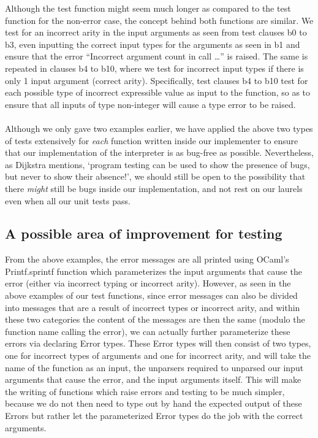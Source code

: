 Although the test function might seem much longer as compared to the test function for the non-error case, the concept behind both functions are similar. We test for an incorrect arity in the input arguments as seen from test 
clauses b0 to b3, even inputting the correct input types for the arguments as seen in b1 and ensure that the error “Incorrect argument count in call …” is raised. The same is repeated in clauses b4 to b10, where we test for 
incorrect input types if there is only 1 input argument (correct arity). Specifically, test clauses b4 to b10 test for each possible type of incorrect expressible value as input to the function, so as to ensure that all inputs 
of type non-integer will cause a type error to be raised.
\\
\\
Although we only gave two examples earlier, we have applied the above two types of tests extensively for \textit{each} function written inside our implementer to ensure that our implementation of the interpreter is as 
bug-free as possible. Nevertheless, as Dijkstra mentions, ‘program testing can be used to show the presence of bugs, but never to show their absence!’, we should still be open to the possibility that there \textit{might}
still be bugs inside our implementation, and not rest on our laurels even when all our unit tests pass.
\subsection{A possible area of improvement for testing}
From the above examples, the error messages are all printed using OCaml’s Printf.sprintf function which parameterizes the input arguments that cause the error (either via incorrect typing or incorrect arity). However, as seen 
in the above examples of our test functions, since error messages can also be divided into messages that are a result of incorrect types or incorrect arity, and within these two categories the content of the messages are 
then the same (modulo the function name calling the error), we can actually further parameterize these errors via declaring Error types. These Error types will then consist of two types, one for incorrect types of arguments 
and one for incorrect arity, and will take the name of the function as an input, the unparsers required to unparsed our input arguments that cause the error, and the input arguments itself. This will make the writing of 
functions which raise errors and testing to be much simpler, because we do not then need to type out by hand the expected output of these Errors but rather let the parameterized Error types do the job with the correct arguments.

